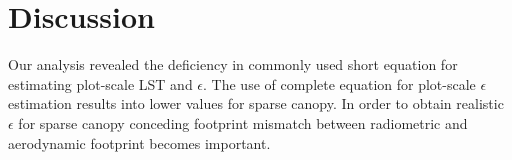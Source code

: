 \documentclass[fleqn,10pt]{wlscirep}
\begin{document}
\section{Discussion}

Our analysis revealed the deficiency in commonly used short equation for estimating plot-scale LST and $\epsilon$. The use of complete equation for plot-scale $\epsilon$ estimation results into lower values for sparse canopy. In order to obtain realistic $\epsilon$ for sparse canopy conceding footprint mismatch between radiometric and aerodynamic footprint becomes important.
\end{document}
